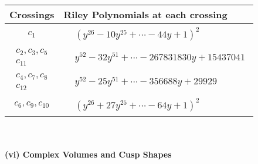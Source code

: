 \documentclass[1p]{elsarticle_modified}
\theoremstyle{definition}
\begin{document}
\begin{tabular}{m{50pt}|m{274pt}}
Crossings & \hspace{64pt}Riley Polynomials at each crossing \\
\hline $$\begin{aligned}c_{1}\end{aligned}$$&$\begin{aligned}
&(y^{26}-10 y^{25}+\cdots-44 y+1)^{2}
\end{aligned}$\\
\hline $$\begin{aligned}c_{2},c_{3},c_{5}\\c_{11}\end{aligned}$$&$\begin{aligned}
&y^{52}-32 y^{51}+\cdots-267831830 y+15437041
\end{aligned}$\\
\hline $$\begin{aligned}c_{4},c_{7},c_{8}\\c_{12}\end{aligned}$$&$\begin{aligned}
&y^{52}-25 y^{51}+\cdots-356688 y+29929
\end{aligned}$\\
\hline $$\begin{aligned}c_{6},c_{9},c_{10}\end{aligned}$$&$\begin{aligned}
&(y^{26}+27 y^{25}+\cdots-64 y+1)^{2}
\end{aligned}$\\
\hline
\end{tabular}\\~\\
\newpage\flushleft \textbf{(vi) Complex Volumes and Cusp Shapes}
\end{document}

